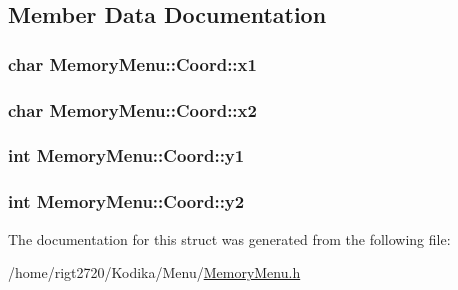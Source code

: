 \subsection{Member Data Documentation}
\hypertarget{structMemoryMenu_1_1Coord_a4c4b189ad28860428a4d67fc921b67c5}{
\subsubsection[{x1}]{\setlength{\rightskip}{0pt plus 5cm}char Memory\-Menu\-::\-Coord\-::x1}}\label{structMemoryMenu_1_1Coord_a4c4b189ad28860428a4d67fc921b67c5}
\hypertarget{structMemoryMenu_1_1Coord_a672b3842f9e422b25d4db1f55b3ed219}{
\subsubsection[{x2}]{\setlength{\rightskip}{0pt plus 5cm}char Memory\-Menu\-::\-Coord\-::x2}}\label{structMemoryMenu_1_1Coord_a672b3842f9e422b25d4db1f55b3ed219}
\hypertarget{structMemoryMenu_1_1Coord_a3917e8bcb72f3894e298141c094cd92c}{
\subsubsection[{y1}]{\setlength{\rightskip}{0pt plus 5cm}int Memory\-Menu\-::\-Coord\-::y1}}\label{structMemoryMenu_1_1Coord_a3917e8bcb72f3894e298141c094cd92c}
\hypertarget{structMemoryMenu_1_1Coord_a6bc07dd964c2d5b87f2c0bf7fd66eee1}{
\subsubsection[{y2}]{\setlength{\rightskip}{0pt plus 5cm}int Memory\-Menu\-::\-Coord\-::y2}}\label{structMemoryMenu_1_1Coord_a6bc07dd964c2d5b87f2c0bf7fd66eee1}


The documentation for this struct was generated from the following file\-:\begin{DoxyCompactItemize}
\item 
/home/rigt2720/\-Kodika/\-Menu/\hyperlink{MemoryMenu_8h}{Memory\-Menu.\-h}\end{DoxyCompactItemize}
